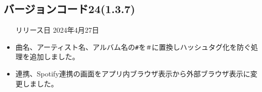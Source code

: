 \subsection*{バージョンコード24(1.3.7)}
\begin{itemize}
    \item[リリース日] 2024年4月27日
\end{itemize}

\new
\begin{itemize}
    \item 曲名、アーティスト名、アルバム名の\verb|#|を\verb|＃|に置換しハッシュタグ化を防ぐ処理を追加しました。
\end{itemize}

\change
\begin{itemize}
    \item \mi 連携、Spotify連携の画面をアプリ内ブラウザ表示から外部ブラウザ表示に変更しました。
\end{itemize}

\fix

